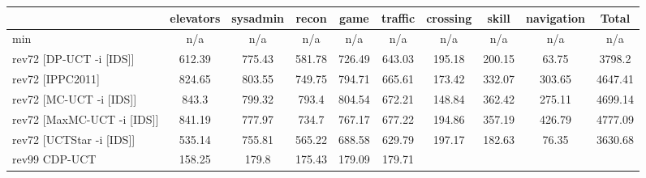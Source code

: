\documentclass{article}
\begin{document}
\begin{tabular}{|l|r@{$\pm$}rr@{$\pm$}rr@{$\pm$}rr@{$\pm$}rr@{$\pm$}rr@{$\pm$}rr@{$\pm$}rr@{$\pm$}rr@{$\pm$}r|}
\hline

& \multicolumn{2}{c}{elevators}
& \multicolumn{2}{c}{sysadmin}
& \multicolumn{2}{c}{recon}
& \multicolumn{2}{c}{game}
& \multicolumn{2}{c}{traffic}
& \multicolumn{2}{c}{crossing}
& \multicolumn{2}{c}{skill}
& \multicolumn{2}{c}{navigation}
& \multicolumn{2}{c|}{Total}
\\
\hline
\hline
min
& \multicolumn{2}{c}{n/a}
& \multicolumn{2}{c}{n/a}
& \multicolumn{2}{c}{n/a}
& \multicolumn{2}{c}{n/a}
& \multicolumn{2}{c}{n/a}
& \multicolumn{2}{c}{n/a}
& \multicolumn{2}{c}{n/a}
& \multicolumn{2}{c}{n/a}
& \multicolumn{2}{c|}{n/a}
\\
rev72 [DP-UCT -i [IDS]]
& \multicolumn{2}{c}{612.39}
& \multicolumn{2}{c}{775.43}
& \multicolumn{2}{c}{581.78}
& \multicolumn{2}{c}{726.49}
& \multicolumn{2}{c}{643.03}
& \multicolumn{2}{c}{195.18}
& \multicolumn{2}{c}{200.15}
& \multicolumn{2}{c}{63.75}
& \multicolumn{2}{c|}{3798.2}
\\
rev72 [IPPC2011]
& \multicolumn{2}{c}{824.65}
& \multicolumn{2}{c}{803.55}
& \multicolumn{2}{c}{749.75}
& \multicolumn{2}{c}{794.71}
& \multicolumn{2}{c}{665.61}
& \multicolumn{2}{c}{173.42}
& \multicolumn{2}{c}{332.07}
& \multicolumn{2}{c}{303.65}
& \multicolumn{2}{c|}{4647.41}
\\
rev72 [MC-UCT -i [IDS]]
& \multicolumn{2}{c}{843.3}
& \multicolumn{2}{c}{799.32}
& \multicolumn{2}{c}{793.4}
& \multicolumn{2}{c}{804.54}
& \multicolumn{2}{c}{672.21}
& \multicolumn{2}{c}{148.84}
& \multicolumn{2}{c}{362.42}
& \multicolumn{2}{c}{275.11}
& \multicolumn{2}{c|}{4699.14}
\\
rev72 [MaxMC-UCT -i [IDS]]
& \multicolumn{2}{c}{841.19}
& \multicolumn{2}{c}{777.97}
& \multicolumn{2}{c}{734.7}
& \multicolumn{2}{c}{767.17}
& \multicolumn{2}{c}{677.22}
& \multicolumn{2}{c}{194.86}
& \multicolumn{2}{c}{357.19}
& \multicolumn{2}{c}{426.79}
& \multicolumn{2}{c|}{4777.09}
\\
rev72 [UCTStar -i [IDS]]
& \multicolumn{2}{c}{535.14}
& \multicolumn{2}{c}{755.81}
& \multicolumn{2}{c}{565.22}
& \multicolumn{2}{c}{688.58}
& \multicolumn{2}{c}{629.79}
& \multicolumn{2}{c}{197.17}
& \multicolumn{2}{c}{182.63}
& \multicolumn{2}{c}{76.35}
& \multicolumn{2}{c|}{3630.68}
\\
\hline
rev99 CDP-UCT
& \multicolumn{2}{c}{158.25}
& \multicolumn{2}{c}{179.8}
& \multicolumn{2}{c}{175.43}
& \multicolumn{2}{c}{179.09}
& \multicolumn{2}{c}{179.71}

\end{tabular}
\end{document}
